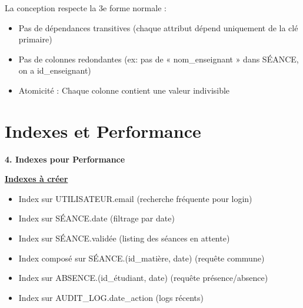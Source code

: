 La conception respecte la 3e forme normale :
\begin{itemize}
  \item Pas de dépendances transitives (chaque attribut dépend uniquement de la clé primaire)
  \item Pas de colonnes redondantes (ex: pas de « nom\_enseignant » dans SÉANCE, on a id\_enseignant)
  \item Atomicité : Chaque colonne contient une valeur indivisible
\end{itemize}

\section{Indexes et Performance}

\textbf{4. Indexes pour Performance}

\underline{\textbf{Indexes à créer}}
\begin{itemize}
  \item Index sur UTILISATEUR.email (recherche fréquente pour login)
  \item Index sur SÉANCE.date (filtrage par date)
  \item Index sur SÉANCE.validée (listing des séances en attente)
  \item Index composé sur SÉANCE.(id\_matière, date) (requête commune)
  \item Index sur ABSENCE.(id\_étudiant, date) (requête présence/absence)
  \item Index sur AUDIT\_LOG.date\_action (logs récents)
\end{itemize}

\vfill